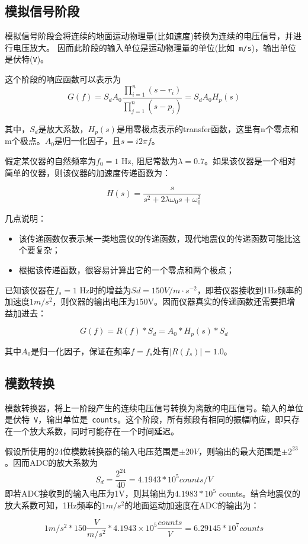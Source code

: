 \subsection{模拟信号阶段}
模拟信号阶段会将连续的地面运动物理量(比如速度)转换为连续的电压信号，并进行电压放大。
因而此阶段的输入单位是运动物理量的单位(比如~\verb+m/s+)，输出单位是伏特(\verb+V+)。

这个阶段的响应函数可以表示为
\[
    G(f)=S_d A_0 \frac{\prod_{i=1}^{n} (s-r_i)}{\prod_{j=1}^{n} (s-p_j)}=S_d A_0 H_p(s)
\]

其中，$S_d$是放大系数，$H_p(s)$是用零极点表示的transfer函数，这里有n个零点和m个极点。$A_0$是归一化因子，且$s=i 2\pi f$。

假定某仪器的自然频率为$f_0=1$ Hz, 阻尼常数为$\lambda=0.7$。如果该仪器是一个相对简单的仪器，则该仪器的加速度传递函数为：

\[
    H(s) = \frac{s}{s^2+2\lambda \omega_0 s + \omega_0^2}
\]

几点说明：
\begin{itemize}
\item 该传递函数仅表示某一类地震仪的传递函数，现代地震仪的传递函数可能比这个要复杂；
\item 根据该传递函数，很容易计算出它的一个零点和两个极点；
\end{itemize}

已知该仪器在$f_s=1$ Hz时的增益为$Sd=150 V/m \cdot s^{-2}$，即若仪器接收到1Hz频率的加速度$1 m/s^2$，则仪器的输出电压为150V。因而仪器真实的传递函数还需要把增益加进去：

\[
    G(f) = R(f)*S_d = A_0*H_p(s)*S_d
\]

其中$A_0$是归一化因子，保证在频率$f=f_s$处有$|R(f_s)|=1.0$。

\subsection{模数转换}
模数转换器，将上一阶段产生的连续电压信号转换为离散的电压信号。输入的单位是伏特~\verb+V+，输出单位是~\verb+counts+。这个阶段，所有频段有相同的振幅响应，即只存在一个放大系数，同时可能存在一个时间延迟。

假设所使用的24位模数转换器的输入电压范围是$\pm 20 V$，则输出的最大范围是$\pm 2^{23}$。因而ADC的放大系数为
\[
    S_d = \frac{2^{24}}{40} = 4.1943*10^{5} counts/V
\]
即若ADC接收到的输入电压为1V，则其输出为$4.1983*10^5$ counts。结合地震仪的放大系数可知，1Hz频率的$1 m/s^2$的地面运动加速度在ADC的输出为：

\[
    1 m/s^2 * 150 \frac{V}{m/s^2} * 4.1943\times 10^5 \frac{counts}{V} = 6.29145*10^7 counts
\]

